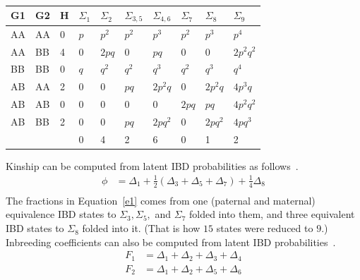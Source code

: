\documentclass[11pt,Times]{article}
\def\cite{\citep}
\begin{document}
\begin{table}[htp] 
\begin{center}
\begin{tabular}{lll|lllllll}
G1 & G2 & H & $\Sigma_1$ &  $\Sigma_2$ &  $\Sigma_{3,5}$ &  $\Sigma_{4,6}$  &  $\Sigma_7$ &  $\Sigma_8$ &  $\Sigma_9$ \\
\hline 
AA &AA &0 & $p$ & $p^2$ & $p^2$ & $p^3$  & $p^2$ & $p^3$ & $p^4$ \\       
AA &BB &4 & $0$ & $2pq$ & $0$ & $pq$   & $0$ & $0$ &$2p^2q^2$ \\
BB &BB  &0& $q$ & $q^2$ & $q^2$ & $q^3$  & $q^2$ & $q^3$ & $q^4$ \\       
AB &AA &2 & $0$ & $0$ & $pq$ & $2p^2q$  & $0$ & $2p^2q$ &$4p^3q$ \\
AB &AB &0 & $0$ & $0$ & $0$ & $0$  & $2pq$ & $pq$ &$4p^2q^2$ \\
AB &BB &2& $0$ & $0$ & $pq$ & $2pq^2$  & $0$ & $2pq^2$ &$4pq^3$ \\
\hline 
& && 0 & 4 & 2 & 6 & 0 & 1 & 2 \\
  \end{tabular}
  \caption{}\label{distr}
  \end{center}
\end{table}


Kinship can be computed from latent IBD probabilities as follows~\cite{jacquard.72}. 
\begin{equation}\label{e1}
\begin{aligned}
\phi &= \Delta_1 + \frac{1}{2}(\Delta_3+\Delta_5+\Delta_7) + \frac{1}{4} \Delta_8  \\
\end{aligned}
\end{equation}
The fractions in Equation~\eqref{e1} comes from one (paternal and maternal) equivalence IBD states to $\Sigma_3, \Sigma_5,$ and $\Sigma_7$ folded into them, and three equivalent IBD states to $\Sigma_8$ folded into it. (That is how $15$ states were reduced to $9$.)  Inbreeding coefficients can also be computed from latent IBD probabilities~\cite{jacquard.72}. 
\begin{equation}\label{e2}
\begin{aligned}
F_1 &= \Delta_1 + \Delta_2 + \Delta_3 + \Delta_4 \\
F_2 &= \Delta_1 + \Delta_2 + \Delta_5 + \Delta_6 \\
\end{aligned}
\end{equation}
\end{document}
